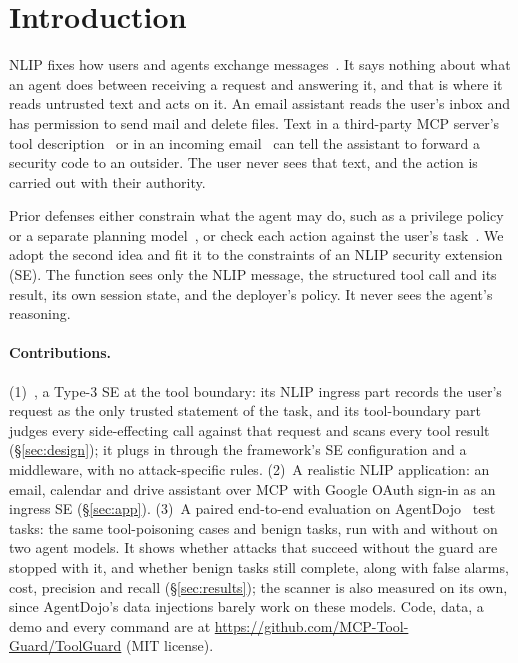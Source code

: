 \section{Introduction}

NLIP fixes how users and agents exchange messages~\cite{ecma430,ecma431}. It says nothing
about what an agent does between receiving a request and answering it, and that is where it
reads untrusted text and acts on it. An email assistant reads the user's inbox and has
permission to send mail and delete files. Text in a third-party MCP server's tool
description~\cite{mcp,invariant2025} or in an incoming email~\cite{greshake2023} can tell
the assistant to forward a security code to an outsider. The user never sees that text, and
the action is carried out with their authority.

Prior defenses either constrain what the agent may do, such as a privilege policy or a
separate planning model~\cite{progent,camel}, or check each action against the user's
task~\cite{taskshield,llamafirewall}. We adopt the second idea and fit it to the constraints
of an NLIP security extension (SE). The function sees only the NLIP message, the structured
tool call and its result, its own session state, and the deployer's policy. It never sees the
agent's reasoning.

\paragraph{Contributions.} (1)~\sys, a Type-3 SE at the tool boundary: its NLIP ingress part
records the user's request as the only trusted statement of the task, and its tool-boundary
part judges every side-effecting call against that request and scans every tool result
(\S\ref{sec:design}); it plugs in through the framework's SE configuration and a middleware,
with no attack-specific rules. (2)~A realistic NLIP application: an email, calendar and drive
assistant over MCP with Google OAuth sign-in as an ingress SE (\S\ref{sec:app}). (3)~A paired
end-to-end evaluation on AgentDojo~\cite{agentdojo} test tasks: the same tool-poisoning cases
and benign tasks, run with and without \sys{} on two agent models. It shows whether attacks
that succeed without the guard are stopped with it, and whether benign tasks still complete,
along with false alarms, cost, precision and recall (\S\ref{sec:results}); the scanner is also measured on its own, since AgentDojo's data
injections barely work on these models.
Code, data, a demo and every command are at
\url{https://github.com/MCP-Tool-Guard/ToolGuard} (MIT license).
